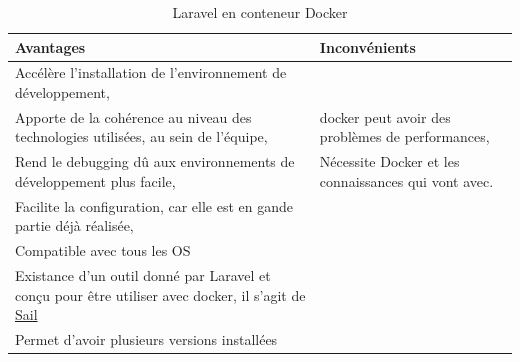 \documentclass[
    iai, %
    il, %
]{heig-tb}
\begin{document}
\begin{table}[h]
    \begin{center}
        \caption{Laravel en conteneur Docker \label{dev-laravel-docker}}
        \begin{tabularx}{1.0\textwidth} {X|X}
            Avantages                                                                                                                 & Inconvénients
            \\ \hline
            Accélère l'installation de l'environnement de développement, \cite{labrecque}                                             &                                                                         \\
            Apporte de la cohérence au niveau des technologies utilisées, au sein de l'équipe, \cite{labrecque, data-flair-use-cases} & \Gls{docker} peut avoir des problèmes de performances, \cite{labrecque} \\
            Rend le debugging dû aux environnements de développement plus facile, \cite{labrecque,koukia}                             & Nécessite Docker et les connaissances qui vont avec. \cite{labrecque}   \\
            Facilite la configuration, car elle est en gande partie déjà réalisée, \cite{data-flair-pros-cons}                        &                                                                         \\
            Compatible avec tous les OS                                                                                               &                                                                         \\
            Existance d'un outil donné par Laravel et conçu pour être utiliser avec \Gls{docker}, il
            s'agit de \href{https://laravel.com/docs/9.x/sail}{Sail}
                                                                                                                                      &                                                                         \\
            Permet d'avoir plusieurs versions installées                                                                              &                                                                         \\
        \end{tabularx}
    \end{center}
\end{table}
\end{document}
